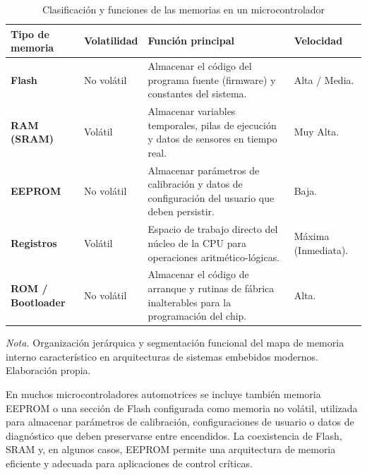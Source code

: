 \begin{table}[h]
	\centering
	\captionsetup{labelformat=simple, labelsep=newline, textfont=it, labelfont=bf}
	\caption{Clasificación y funciones de las memorias en un microcontrolador}
	\label{tab:memo}
	\vspace{0.3cm}
	
	\begin{tabularx}{\linewidth}{p{3.2cm} p{2.2cm} X p{2.8cm}}
		\toprule %
		\rowcolor[rgb]{0.851, 0.851, 0.851}
		\textbf{Tipo de memoria} & \textbf{Volatilidad} & \textbf{Función principal} & \textbf{Velocidad} \\
		\midrule %
		\textbf{Flash} & No volátil & Almacenar el código del programa fuente (firmware) y constantes del sistema. & Alta / Media. \\
		\addlinespace
		\textbf{RAM (SRAM)} & Volátil & Almacenar variables temporales, pilas de ejecución y datos de sensores en tiempo real. & Muy Alta. \\
		\addlinespace
		\textbf{EEPROM} & No volátil & Almacenar parámetros de calibración y datos de configuración del usuario que deben persistir. & Baja. \\
		\addlinespace
		\textbf{Registros} & Volátil & Espacio de trabajo directo del núcleo de la CPU para operaciones aritmético-lógicas. & Máxima (Inmediata). \\
		\addlinespace
		\textbf{ROM / Bootloader} & No volátil & Almacenar el código de arranque y rutinas de fábrica inalterables para la programación del chip. & Alta. \\
		\bottomrule %
	\end{tabularx}
	\vspace{0.2cm}
	
	\begin{flushleft}
		\footnotesize \textit{Nota.} Organización jerárquica y segmentación funcional del mapa de memoria interno característico en arquitecturas de sistemas embebidos modernos. Elaboración propia.
	\end{flushleft}
\end{table}

En muchos microcontroladores automotrices se incluye también memoria EEPROM o una sección de Flash configurada como memoria no volátil, utilizada para almacenar parámetros de calibración, configuraciones de usuario o datos de diagnóstico que deben preservarse entre encendidos. La coexistencia de Flash, SRAM y, en algunos casos, EEPROM permite una arquitectura de memoria eficiente y adecuada para aplicaciones de control críticas.

